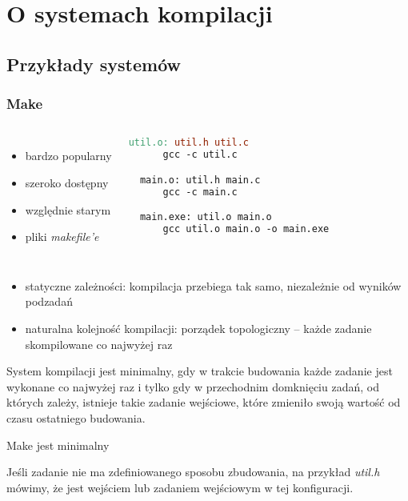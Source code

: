 
\section{O systemach kompilacji}

\subsection{Przykłady systemów}

\begin{frame}[fragile]
  \frametitle{Make}
  \begin{columns}[t]
    \begin{itemize}
    \item bardzo popularny
    \item szeroko dostępny
    \item względnie starym
    \item pliki \textit{makefile'e}
    \end{itemize}

    \begin{lstlisting}[language=make, basicstyle=\scriptsize\ttfamily]
  util.o: util.h util.c
      gcc -c util.c

  main.o: util.h main.c
      gcc -c main.c

  main.exe: util.o main.o
      gcc util.o main.o -o main.exe
    \end{lstlisting}
  \end{columns}
  \begin{itemize}
  \item statyczne zależności: kompilacja przebiega tak samo, niezależnie od wyników podzadań
  \item naturalna kolejność kompilacji: porządek topologiczny -- każde zadanie skompilowane co najwyżej raz
  \end{itemize}
\end{frame}

\begin{frame}
  \begin{definition}[Minimalność]
    System kompilacji jest minimalny, gdy w trakcie budowania każde zadanie jest wykonane co najwyżej raz i tylko gdy w przechodnim domknięciu zadań, od których zależy, istnieje takie zadanie wejściowe, które zmieniło swoją wartość od czasu ostatniego budowania.
  \end{definition}

  \begin{example}
    Make jest minimalny
  \end{example}

  \begin{definition}
     Jeśli zadanie nie ma zdefiniowanego sposobu zbudowania, na przykład \textit{util.h} mówimy, że jest wejściem lub zadaniem wejściowym w tej konfiguracji.
  \end{definition}
\end{frame}

